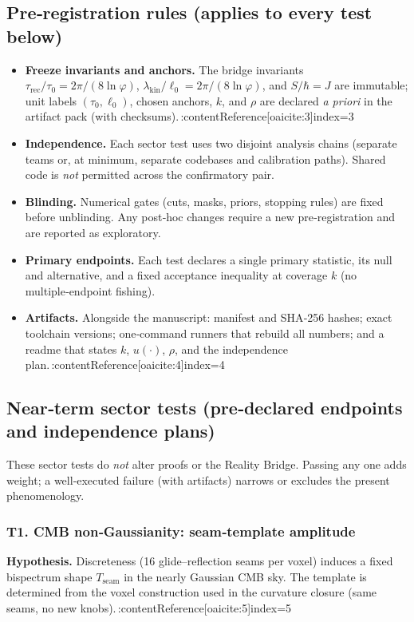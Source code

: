 \documentclass[11pt]{article}
\begin{document}
\subsection{Pre‑registration rules (applies to every test below)}
\begin{itemize}
  \item \textbf{Freeze invariants and anchors.} The bridge invariants
  $\tau_{\mathrm{rec}}/\tau_{0}=2\pi/(8\ln\varphi)$,
  $\lambda_{\mathrm{kin}}/\ell_{0}=2\pi/(8\ln\varphi)$, and $S/\hbar=J$
  are immutable; unit labels $(\tau_{0},\ell_{0})$, chosen anchors, $k$, and $\rho$ are declared \emph{a priori} in the artifact pack (with checksums).\,:contentReference[oaicite:3]{index=3}
  \item \textbf{Independence.} Each sector test uses two disjoint analysis chains (separate teams or, at minimum, separate codebases and calibration paths). Shared code is \emph{not} permitted across the confirmatory pair.
  \item \textbf{Blinding.} Numerical gates (cuts, masks, priors, stopping rules) are fixed before unblinding. Any post‑hoc changes require a new pre‑registration and are reported as exploratory.
  \item \textbf{Primary endpoints.} Each test declares a single primary statistic, its null and alternative, and a fixed acceptance inequality at coverage $k$ (no multiple‑endpoint fishing).
  \item \textbf{Artifacts.} Alongside the manuscript: manifest and SHA‑256 hashes; exact toolchain versions; one‑command runners that rebuild all numbers; and a readme that states $k$, $u(\cdot)$, $\rho$, and the independence plan.\,:contentReference[oaicite:4]{index=4}
\end{itemize}

\subsection{Near‑term sector tests (pre‑declared endpoints and independence plans)}
These sector tests do \emph{not} alter proofs or the Reality Bridge. Passing any one adds weight; a well‑executed failure (with artifacts) narrows or excludes the present phenomenology.

\subsubsection*{T1. CMB non‑Gaussianity: seam‑template amplitude}
\textbf{Hypothesis.} Discreteness (16 glide–reflection seams per voxel) induces a fixed bispectrum shape $T_{\mathrm{seam}}$ in the nearly Gaussian CMB sky. The template is determined from the voxel construction used in the curvature closure (same seams, no new knobs).\,:contentReference[oaicite:5]{index=5}
\end{document}
